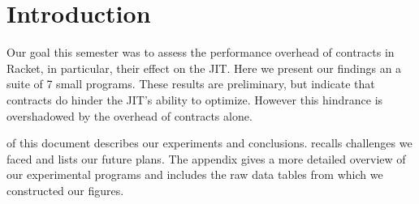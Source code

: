 \section{Introduction}
\label{intro}

Our goal this semester was to assess the performance overhead of contracts in Racket, in particular, their effect on the JIT.
Here we present our findings an a suite of 7 small programs.
These results are preliminary, but indicate that contracts do hinder the JIT's ability to optimize.
However this hindrance is overshadowed by the overhead of contracts alone.

 of this document describes our experiments and conclusions.
 recalls challenges we faced and lists our future plans.
The appendix gives a more detailed overview of our experimental programs and includes the raw data tables from which we constructed our figures.
